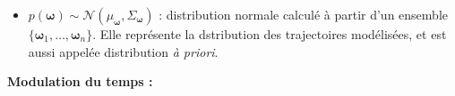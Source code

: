 \documentclass[utf8]{frontiersSCNS} %
\newcommand{\rev}[1]{\textcolor{blue}{#1}}
\newcommand{\todo}[1]{\textcolor{red}{\textbf{/*#1*/}}}
\begin{document}
\begin{itemize}
\item $p(\boldsymbol{\omega}) \sim \mathcal{N}(\mu_{\boldsymbol{\omega}}, \Sigma_{\boldsymbol{\omega}})$ : distribution normale calculé à partir d'un ensemble $\{\boldsymbol{\omega}_1, \ldots, \boldsymbol{\omega}_n\}$.  Elle représente la dstribution des trajectoires modélisées, et est aussi appelée distribution \textit{à priori}.


\end{itemize}
\textbf{Modulation du temps :}
\end{document}
